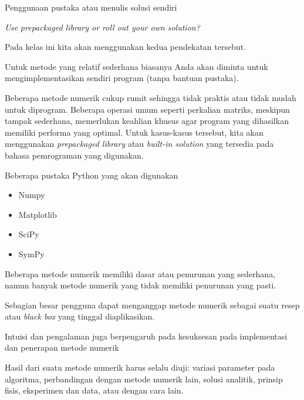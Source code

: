 \begin{frame}{Penggunaan pustaka atau menulis solusi sendiri}

\textit{Use prepackaged library or roll out your own solution?}

Pada kelas ini kita akan menggunakan kedua pendekatan tersebut.

Untuk metode yang relatif sederhana biasanya Anda akan diminta
untuk mengimplementasikan sendiri program (tanpa bantuan pustaka).

Beberapa metode numerik cukup rumit sehingga tidak praktis atau
tidak mudah untuk diprogram.
Beberapa operasi umum
seperti perkalian matriks, meskipun tampak sederhana, memerlukan
keahlian khusus agar program yang dihasilkan memiliki performa
yang optimal. Untuk kasus-kasus tersebut, kita akan menggunakan
\textit{prepackaged library} atau \textit{built-in solution} yang
tersedia pada bahasa pemrograman yang digunakan.

\end{frame}



\begin{frame}{Beberapa pustaka Python yang akan digunakan}

\begin{itemize}
\item Numpy
\item Matplotlib
\item SciPy
\item SymPy
\end{itemize}

\end{frame}


\begin{frame}

Beberapa metode numerik memiliki dasar atau penurunan yang sederhana,
namun banyak metode numerik yang tidak memiliki penurunan yang pasti.
  
Sebagian besar pengguna dapat menganggap metode
numerik sebagai suatu resep atau \textit{black box} yang tinggal
diaplikasikan.
  
Intuisi dan pengalaman juga berpengaruh pada kesuksesan pada implementasi
dan penerapan metode numerik

Hasil dari suatu metode numerik harus selalu diuji: variasi parameter
pada algoritma, perbandingan dengan
metode numerik lain, solusi analitik, prinsip fisis, eksperimen dan data, atau
dengan cara lain.
  
\end{frame}



